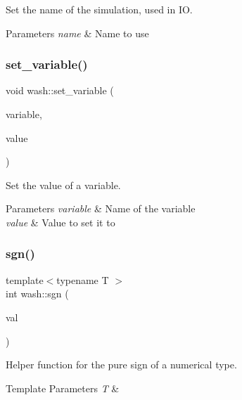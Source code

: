 Set the name of the simulation, used in IO. 


\begin{DoxyParams}{Parameters}
{\em name} & Name to use \\
\hline
\end{DoxyParams}
\mbox{\label{namespacewash_a5045909b6d97db3d92cc44bfd5df70ee}} 
\subsubsection{\texorpdfstring{set\+\_\+variable()}{set\_variable()}}
{\footnotesize\ttfamily void wash\+::set\+\_\+variable (\begin{DoxyParamCaption}\item[{const std\+::string \&}]{variable,  }\item[{const double}]{value }\end{DoxyParamCaption})}



Set the value of a variable. 


\begin{DoxyParams}{Parameters}
{\em variable} & Name of the variable \\
\hline
{\em value} & Value to set it to \\
\hline
\end{DoxyParams}
\mbox{\label{namespacewash_a706d6d30508a81b6b9f25494cd759dff}} 
\subsubsection{\texorpdfstring{sgn()}{sgn()}}
{\footnotesize\ttfamily template$<$typename T $>$ \\
int wash\+::sgn (\begin{DoxyParamCaption}\item[{T}]{val }\end{DoxyParamCaption})}



Helper function for the pure sign of a numerical type. 


\begin{DoxyTemplParams}{Template Parameters}
{\em T} & \\
\hline
\end{DoxyTemplParams}


